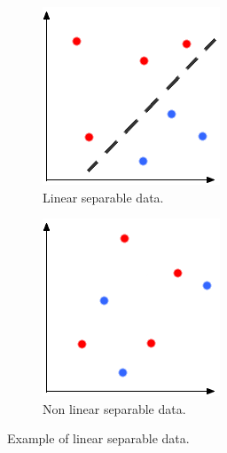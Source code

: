 \begin{centering}
\begin{figure}
  \begin{subfigure}[b]{0.4\textwidth}
    \includegraphics[width=\textwidth]{images/nn/separable.png}
    \caption{Linear separable data.}
  \end{subfigure}
  \hspace{12mm}
  \begin{subfigure}[b]{0.4\textwidth}
    \includegraphics[width=\textwidth]{images/nn/non-separable.png}
    \caption{Non linear separable data.}
  \end{subfigure}
  \caption{Example of linear separable data.\label{fig:ls-example}}
\end{figure}
\end{centering}

